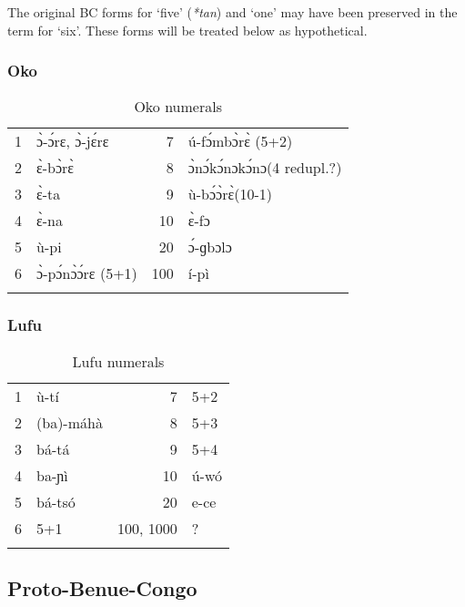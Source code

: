 The original BC forms for ‘five’ (\textit{*tan}) and ‘one’ may have been preserved in the term for ‘six’. These forms will be treated below as hypothetical.

\clearpage
\subsubsection{Oko}\label{sec:3.1.3.3}
\begin{table}
\caption{\label{tab:3:51}Oko numerals }


\begin{tabularx}{.75\textwidth}{rXrl}
\lsptoprule

{1} & {\`{ɔ}}-{\'{ɔ}}rɛ, {\`{ɔ}}-j{\'{ɛ}}rɛ & {7} & ú-f{\'{ɔ}}mb{\`{ɔ}}r{\`{ɛ}} (5+2)\\
{2} & {\`{ɛ}}-b{\`{ɔ}}r{\`{ɛ}} & {8} & {\`{ɔ}}n{\'{ɔ}}k{\'{ɔ}}nɔk{\'{ɔ}}nɔ(4 redupl.?)\\
{3} & {\`{ɛ}}-ta & {9} & ù-b{\'{ɔ}}{\`{ɔ}}r{\`{ɛ}}(10-1)\\
{4} & {\`{ɛ}}-na & {10} & {\`{ɛ}}-fɔ\\
{5} & ù-pi & {20} & {\'{ɔ}}-ɡbɔlɔ\\
{6} & {\`{ɔ}}-p{\'{ɔ}}n{\`{ɔ}}{\'{ɔ}}rɛ (5+1) & {100} & í-pì\\
\lspbottomrule
\end{tabularx}
\end{table}

 
\subsubsection{Lufu}\label{sec:3.1.3.4}

\begin{table}
\caption{\label{tab:3:52}Lufu numerals}


\begin{tabularx}{.75\textwidth}{rXrl}
\lsptoprule

{1} & ù-tí & {7} & 5+2\\
{2} & (ba)-máhà & {8} & 5+3\\
{3} & bá-tá & {9} & 5+4\\
{4} & ba-ɲì & {10} & ú-wó\\
{5} & bá-tsó & {20} & e-ce\\
{6} & 5+1 & {100,} {1000} & ? \\
\lspbottomrule
\end{tabularx}
\end{table}

 
\subsection{Proto-Benue-Congo}\label{sec:3.1.4}
